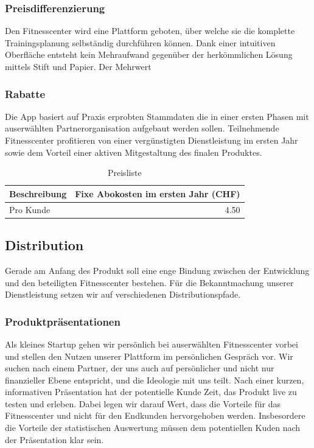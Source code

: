 \subsubsection{Preisdifferenzierung}
Den Fitnesscenter wird eine Plattform geboten, über welche sie die komplette Trainingsplanung selbständig durchführen können. Dank einer intuitiven Oberfläche entsteht kein Mehraufwand gegenüber der herkömmlichen Lösung mittels Stift und Papier. Der Mehrwert 


\subsubsection{Rabatte}
Die App basiert auf Praxis erprobten Stammdaten die in einer ersten Phasen mit auserwählten Partnerorganisation aufgebaut werden sollen. Teilnehmende Fitnesscenter profitieren von einer vergünstigten Dienstleistung im ersten Jahr sowie dem Vorteil einer aktiven Mitgestaltung des finalen Produktes. 

\begin{table}[h]
	\centering
	\begin{tabu} to \linewidth {l r}
		\toprule 
		Beschreibung & Fixe Abokosten im ersten Jahr (CHF) \\
		\midrule
		Pro Kunde & 4.50 \\
		\bottomrule 
	\end{tabu} 
	\caption{Preisliste}
\end{table}

\subsection{Distribution}
Gerade am Anfang des Produkt soll eine enge Bindung zwischen der Entwicklung und den beteiligten Fitnesscenter bestehen. Für die Bekanntmachung unserer Dienstleistung setzen wir auf verschiedenen Distributionspfade. 

\subsubsection{Produktpräsentationen}
Als kleines Startup gehen wir persönlich bei auserwählten Fitnesscenter vorbei und stellen den Nutzen unserer Plattform im persönlichen Gespräch vor. Wir suchen nach einem Partner, der uns auch auf persönlicher und nicht nur finanzieller Ebene entspricht, und die Ideologie mit uns teilt. Nach einer kurzen, informativen Präsentation hat der potentielle Kunde Zeit, das Produkt live zu testen und erleben. Dabei legen wir darauf Wert, dass die Vorteile für das Fitnesscenter und nicht für den Endkunden hervorgehoben werden. Insbesordere die Vorteile der statistischen Auswertung müssen dem potentiellen Kuden nach der Präsentation klar sein.

